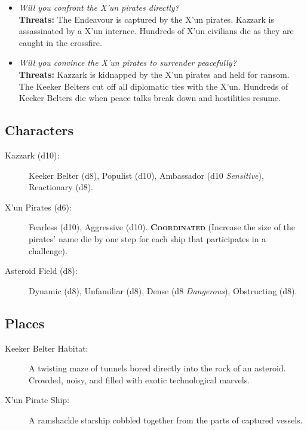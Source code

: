 \documentclass[11pt, a5paper, parskip=half-, DIV=12]{scrartcl}
\begin{document}
\begin{itemize}
	\item \textit{Will you confront the X'un pirates directly?} \\ \textbf{Threats:} The Endeavour is captured by the X'un pirates. Kazzark is assassinated by a X'un internee. Hundreds of X'un civilians die as they are caught in the crossfire.
	\item \textit{Will you convince the X'un pirates to surrender peacefully?} \\ \textbf{Threats:} Kazzark is kidnapped by the X'un pirates and held for ransom. The Keeker Belters cut off all diplomatic ties with the X'un. Hundreds of Keeker Belters die when peace talks break down and hostilities resume.
\end{itemize}

\newpage

\subsection*{Characters}
\begin{description}
	\item[Kazzark (d10):] Keeker Belter (d8), Populist (d10), Ambassador (d10 \textit{Sensitive}), Reactionary (d8).
	\item[X'un Pirates (d6):] Fearless (d10), Aggressive (d10). \textbf{\textsc{Coordinated}} (Increase the size of the pirates' name die by one step for each ship that participates in a challenge).
	\item[Asteroid Field (d8):] Dynamic (d8), Unfamiliar (d8),  Dense (d8 \textit{Dangerous}), Obstructing (d8).
\end{description}

\subsection*{Places}
\begin{description}
	\item[Keeker Belter Habitat:] A twisting maze of tunnels bored directly into the rock of an asteroid. Crowded, noisy, and filled with exotic technological marvels.
	\item[X'un Pirate Ship:] A ramshackle starship cobbled together from the parts of captured vessels. 
\end{description}
\end{document}
